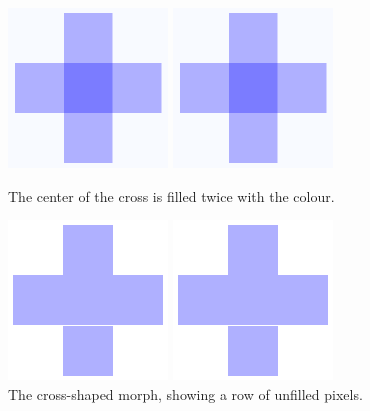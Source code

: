 \documentclass[a4paper,10pt,twoside]{book}
\begin{document}
\begin{figure}[t]
\begin{minipage}{0.48\textwidth}
	\ifluluelse
		{\centerline{\includegraphics[scale=0.6]{overdrawBug}}}
		{\centerline{\includegraphics{overdrawBug}}}
	\caption{The center of the cross is filled twice with the colour.
		\label{fig:overdrawBug}}
\end{minipage}
\hfill
\begin{minipage}{0.48\textwidth}
	\ifluluelse
		{\centerline{\includegraphics[scale=0.6]{hairlineBug}}}
		{\centerline{\includegraphics{hairlineBug}}}
	\caption{The cross-shaped morph, showing a row of unfilled pixels.
		\label{fig:bug}}
\end{minipage}
\end{figure}
\end{document}
